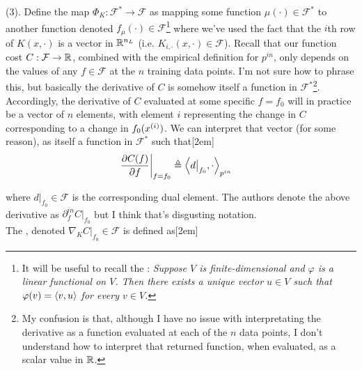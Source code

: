 \documentclass[11pt]{article}
\begin{document}
 (3). Define the map $\Phi_K : \mathcal F^* \to \mathcal F$ as mapping some function $\mu(\cdot) \in \mathcal F^*$ to another function denoted $f_{\mu}(\cdot) \in \mathcal F$\footnote{It will be useful to recall the : \textit{Suppose $V$ is finite-dimensional and $\varphi$ is a linear functional on $V$. Then there exists a \textit{unique} vector $u \in V$ such that  $\varphi(v) = \left\langle v, u \right\rangle$ for every $v \in V$.}}
where we've used the fact that the $i$th row of $K(x, \cdot)$ is a vector in $\mathbb{R}^{n_{L}}$ (i.e. $K_{i, \cdot}(x, \cdot) \in \mathcal F$). Recall that our function cost $C: \mathcal F \to \mathbb{R}$, combined with the empirical definition for $p^{in}$, only depends on the values of any $f \in \mathcal F$ at the $n$ training data points. I'm not sure how to phrase this, but basically the derivative of $C$ is somehow itself a function in $\mathcal F^*$\footnote{My confusion is that, although I have no issue with interpretating the derivative as a function evaluated at each of the $n$ data points, I don't understand how to interpret that returned function, when evaluated, as a scalar value in $\mathbb{R}$.}.  Accordingly, the derivative of $C$ evaluated at some specific $f = f_0$ will  in practice be a vector of $n$ elements, with element $i$ representing the change in $C$ corresponding to a change in $f_0(\ival[i]{x})$. We can interpret that vector (for some reason), as itself a function in $\mathcal F^*$ such that[2em]
\begin{align}
	\frac{\partial C(f)}{\partial f} \bigg|_{f {=} f_0} 
		&\triangleq \left\langle d\big|_{f_0}, \cdot \right\rangle_{p^{in}}
\end{align}

where $d\big|_{f_0} \in \mathcal F$ is the corresponding dual element. The authors denote the above derivative as $\partial^{in}_{f} C \big|_{f_0}$ but I think that's disgusting notation. \\

The , denoted $\nabla_K C\big|_{f_0} \in \mathcal F$ is defined as[2em]
\end{document}
